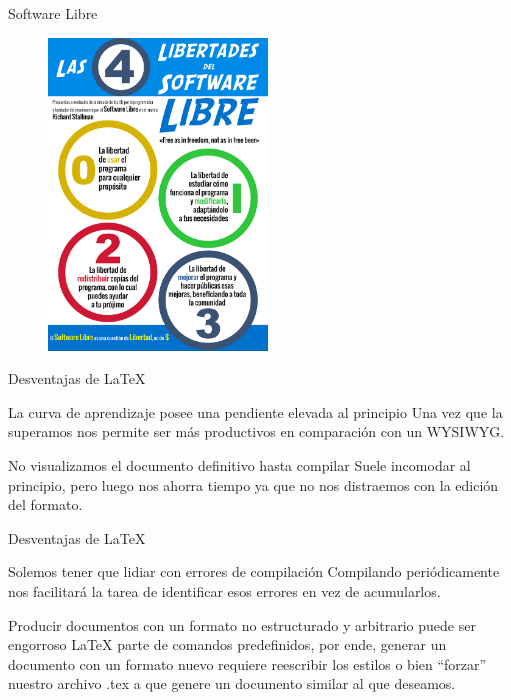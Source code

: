 \documentclass[11pt]{beamer}
\begin{document}
\begin{frame}{Software Libre}
\begin{figure}
\centering
\includegraphics[width=0.52\textwidth]{figs/free-software.png}
\end{figure}
\end{frame}


\begin{frame}{Desventajas de \LaTeX}
\begin{block}{La curva de aprendizaje posee una pendiente elevada al principio}
Una vez que la superamos nos permite ser más productivos en comparación con un WYSIWYG.
\end{block}

\pause
\begin{block}{No visualizamos el documento definitivo hasta compilar}
Suele incomodar al principio, pero luego nos ahorra tiempo ya que no nos distraemos con la edición del formato.
\end{block}
\end{frame}

\begin{frame}{Desventajas de \LaTeX}
\begin{block}{Solemos tener que lidiar con errores de compilación}
Compilando periódicamente nos facilitará la tarea de identificar esos errores en vez de acumularlos.
\end{block}

\pause
\begin{block}{Producir documentos con un formato no estructurado y arbitrario puede ser engorroso}
{\LaTeX} parte de comandos predefinidos, por ende, generar un documento con un formato nuevo requiere reescribir los estilos o bien ``forzar'' nuestro archivo .tex a que genere un documento similar al que deseamos.
\end{block}
\end{frame}
\end{document}
